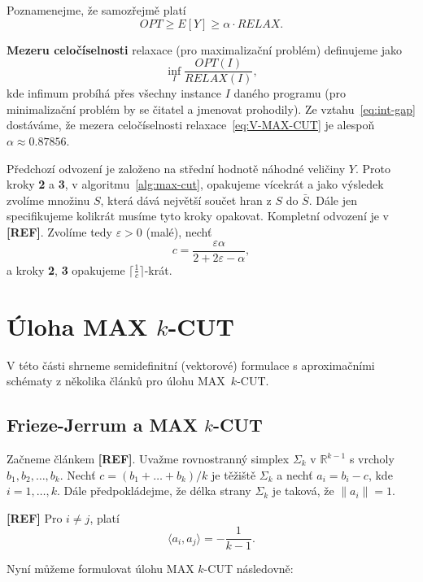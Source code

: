 \noindent Poznamenejme, že samozřejmě platí
\begin{equation}
    OPT \geq E\left[ Y \right] \geq \alpha \cdot RELAX.
    \label{eq:int-gap}
\end{equation}

\noindent \textbf{Mezeru celočíselnosti} relaxace (pro maximalizační problém) definujeme jako
$$
    \inf_{I} \frac{OPT(I)}{RELAX(I)},
$$
kde infimum probíhá přes všechny instance $I$ daného programu (pro minimalizační problém by se čitatel a jmenovat prohodily). Ze vztahu~\ref{eq:int-gap} dostáváme, že mezera celočíselnosti relaxace~\ref{eq:V-MAX-CUT} je alespoň $\alpha \approx 0.87856$.

Předchozí odvození je založeno na střední hodnotě náhodné veličiny $Y$. Proto kroky \textbf{2} a \textbf{3}, v algoritmu~\ref{alg:max-cut}, opakujeme vícekrát a jako výsledek zvolíme množinu $S$, která dává největší součet hran z $S$ do $\bar{S}$. Dále jen specifikujeme kolikrát musíme tyto kroky opakovat. Kompletní odvození je v \textbf{[REF]}. Zvolíme tedy $\varepsilon > 0$ (malé), nechť
$$
    c = \frac{\varepsilon \alpha}{2 + 2\varepsilon - \alpha},
$$
a kroky \textbf{2}, \textbf{3} opakujeme $\lceil \frac{1}{c} \rceil$-krát.


\section{Úloha MAX $k$-CUT}

V této části shrneme semidefinitní (vektorové) formulace s aproximačními schématy z několika článků pro úlohu MAX~$k$-CUT.

\subsection{Frieze-Jerrum a MAX $k$-CUT}

Začneme článkem \textbf{[REF]}. Uvažme rovnostranný simplex $\Sigma_k$ v $\mathbb{R}^{k-1}$ s vrcholy $b_1, b_2, \dots, b_k$. Nechť $c = (b_1 + \dots + b_k) / k$ je těžiště $\Sigma_k$ a nechť $a_i = b_i - c$, kde $i = 1, \dots, k$. Dále předpokládejme, že délka strany $\Sigma_k$ je taková, že $\| a_i\| = 1$.

\begin{lm}\textbf{[REF]}
    Pro $i \neq j$, platí
    $$
        \langle a_i, a_j \rangle = -\frac{1}{k-1}.
    $$
\end{lm}

\noindent Nyní můžeme formulovat úlohu MAX $k$-CUT následovně:

